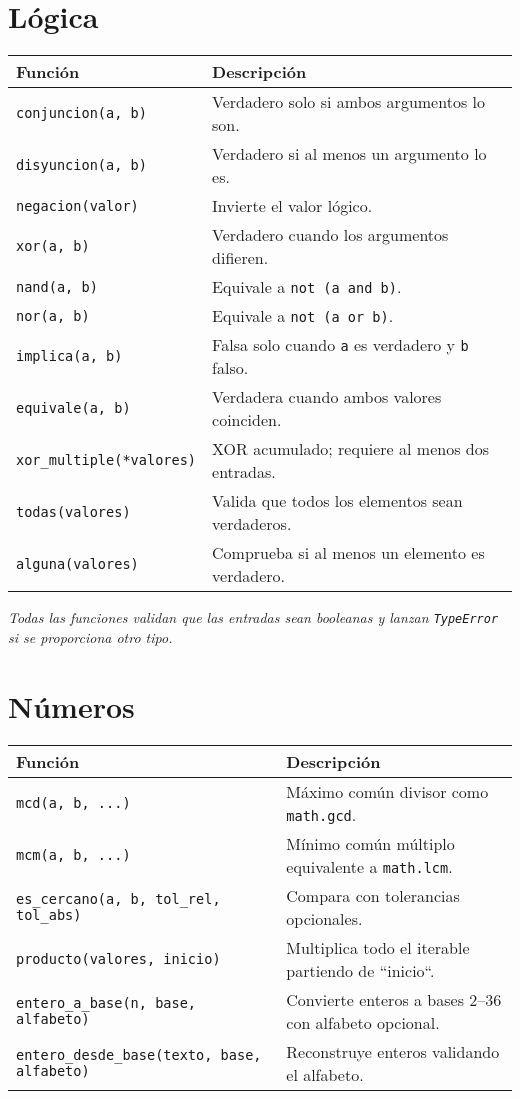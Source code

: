 \documentclass{article}
\begin{document}
\section*{Lógica}
\begin{tabular}{ll}
\textbf{Función} & \textbf{Descripción}\\\hline
\texttt{conjuncion(a, b)} & Verdadero solo si ambos argumentos lo son.\\
\texttt{disyuncion(a, b)} & Verdadero si al menos un argumento lo es.\\
\texttt{negacion(valor)} & Invierte el valor lógico.\\
\texttt{xor(a, b)} & Verdadero cuando los argumentos difieren.\\
\texttt{nand(a, b)} & Equivale a \texttt{not (a and b)}.\\
\texttt{nor(a, b)} & Equivale a \texttt{not (a or b)}.\\
\texttt{implica(a, b)} & Falsa solo cuando \texttt{a} es verdadero y \texttt{b} falso.\\
\texttt{equivale(a, b)} & Verdadera cuando ambos valores coinciden.\\
\texttt{xor\_multiple(*valores)} & XOR acumulado; requiere al menos dos entradas.\\
\texttt{todas(valores)} & Valida que todos los elementos sean verdaderos.\\
\texttt{alguna(valores)} & Comprueba si al menos un elemento es verdadero.\\
\end{tabular}

\textit{Todas las funciones validan que las entradas sean booleanas y lanzan \texttt{TypeError} si se proporciona otro tipo.}

\section*{Números}
\begin{tabular}{ll}
\textbf{Función} & \textbf{Descripción}\\\hline
\texttt{mcd(a, b, ...)} & Máximo común divisor como \texttt{math.gcd}.\\
\texttt{mcm(a, b, ...)} & Mínimo común múltiplo equivalente a \texttt{math.lcm}.\\
\texttt{es\_cercano(a, b, tol\_rel, tol\_abs)} & Compara con tolerancias opcionales.\\
\texttt{producto(valores, inicio)} & Multiplica todo el iterable partiendo de ``inicio``.\\
\texttt{entero\_a\_base(n, base, alfabeto)} & Convierte enteros a bases 2--36 con alfabeto opcional.\\
\texttt{entero\_desde\_base(texto, base, alfabeto)} & Reconstruye enteros validando el alfabeto.\\
\end{tabular}
\end{document}
